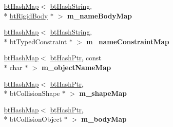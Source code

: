 \begin{DoxyCompactItemize}
\item 
\hypertarget{classbt_world_importer_a4c69ea2f634266a8a43945ee3089b7b5}{\hyperlink{classbt_hash_map}{bt\+Hash\+Map}$<$ \hyperlink{structbt_hash_string}{bt\+Hash\+String}, \\*
\hyperlink{classbt_rigid_body}{bt\+Rigid\+Body} $\ast$ $>$ {\bfseries m\+\_\+name\+Body\+Map}}\label{classbt_world_importer_a4c69ea2f634266a8a43945ee3089b7b5}

\item 
\hypertarget{classbt_world_importer_ad3314e573b4625f18bfa31a2fbdf3d52}{\hyperlink{classbt_hash_map}{bt\+Hash\+Map}$<$ \hyperlink{structbt_hash_string}{bt\+Hash\+String}, \\*
bt\+Typed\+Constraint $\ast$ $>$ {\bfseries m\+\_\+name\+Constraint\+Map}}\label{classbt_world_importer_ad3314e573b4625f18bfa31a2fbdf3d52}

\item 
\hypertarget{classbt_world_importer_a4df4917b9764d6d721f85182a1fb4d10}{\hyperlink{classbt_hash_map}{bt\+Hash\+Map}$<$ \hyperlink{classbt_hash_ptr}{bt\+Hash\+Ptr}, const \\*
char $\ast$ $>$ {\bfseries m\+\_\+object\+Name\+Map}}\label{classbt_world_importer_a4df4917b9764d6d721f85182a1fb4d10}

\item 
\hypertarget{classbt_world_importer_ac72f14f2c6450409465e60daf83c3865}{\hyperlink{classbt_hash_map}{bt\+Hash\+Map}$<$ \hyperlink{classbt_hash_ptr}{bt\+Hash\+Ptr}, \\*
bt\+Collision\+Shape $\ast$ $>$ {\bfseries m\+\_\+shape\+Map}}\label{classbt_world_importer_ac72f14f2c6450409465e60daf83c3865}

\item 
\hypertarget{classbt_world_importer_a2a66e9f199d377ddb4c5141d9889d7d7}{\hyperlink{classbt_hash_map}{bt\+Hash\+Map}$<$ \hyperlink{classbt_hash_ptr}{bt\+Hash\+Ptr}, \\*
bt\+Collision\+Object $\ast$ $>$ {\bfseries m\+\_\+body\+Map}}\label{classbt_world_importer_a2a66e9f199d377ddb4c5141d9889d7d7}

\end{DoxyCompactItemize}


